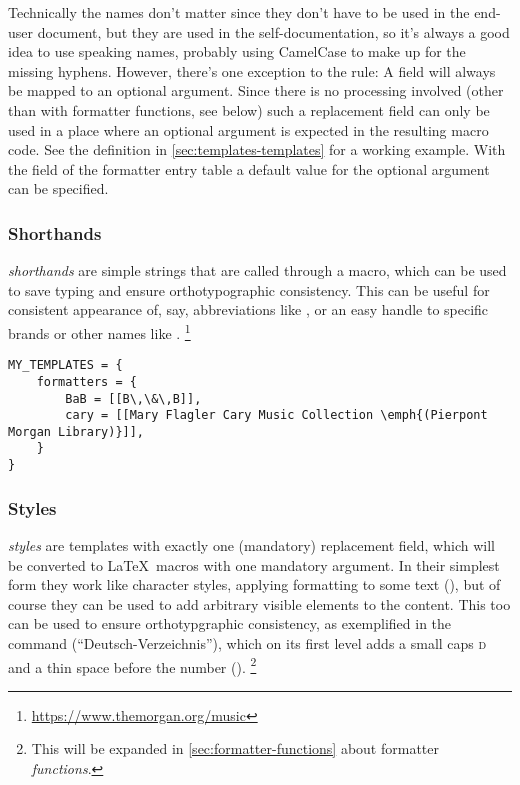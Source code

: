 \documentclass{scrartcl}
\begin{document}
Technically the names don't matter since they don't have to be used in the
end-user document, but they are used in the self-documentation, so it's always a
good idea to use speaking names, probably using CamelCase to make up for the
missing hyphens.  However, there's one exception to the rule: A field
 will always be mapped to an optional argument.  Since
there is no processing involved (other than with formatter functions, see below)
such a replacement field can only be used in a place where an optional argument
is expected in the resulting macro code.  See the  definition in
\vref{sec:templates-templates} for a working example.  With the 
field of the formatter entry table a default value for the optional argument can
be specified.


\subsubsection{Shorthands}
\label{sec:shorthands}

\emph{shorthands} are simple strings that are called through a macro, which can
be used to save typing and ensure orthotypographic consistency.  This can be
useful for consistent appearance of, say, abbreviations like
, or an easy handle to specific brands or
other names like .%
\footnote{\url{https://www.themorgan.org/music}} %

\begin{verbatim}
MY_TEMPLATES = {
    formatters = {
        BaB = [[B\,\&\,B]],
        cary = [[Mary Flagler Cary Music Collection \emph{(Pierpont Morgan Library)}]],
    }
}
\end{verbatim}


\subsubsection{Styles}
\label{sec:styles}

\emph{styles} are templates with exactly one (mandatory) replacement field,
which will be converted to \LaTeX\ macros with one mandatory argument.  In their
simplest form they work like character styles, applying formatting to some text
(), but of course they can be used
to add arbitrary visible elements to the content.  This too can be used to
ensure orthotypgraphic consistency, as exemplified in the command 
(“Deutsch-Verzeichnis”), which on its first level adds a small caps \textsc{d}
and a thin space before the number ().%
\footnote{This will be expanded in \vref{sec:formatter-functions} about formatter
\emph{functions}.}
\end{document}
